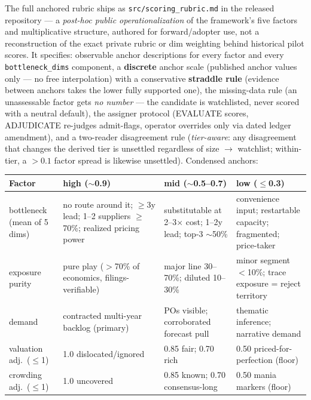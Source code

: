\documentclass[11pt]{article}
\begin{document}
The full anchored rubric ships as \texttt{src/scoring\_rubric.md} in the released repository ---
a \emph{post-hoc public operationalization} of the framework's five factors and multiplicative
structure, authored for forward/adopter use, not a reconstruction of the exact private rubric or
dim weighting behind historical pilot scores. It specifies:
observable anchor descriptions for every factor and every \texttt{bottleneck\_dims} component,
a \textbf{discrete} anchor scale (published anchor values only --- no free interpolation) with a
conservative \textbf{straddle rule} (evidence between anchors takes the lower fully supported
one), the missing-data rule (an unassessable factor gets \emph{no number} --- the candidate
is watchlisted, never scored with a neutral default), the assigner protocol (EVALUATE scores,
ADJUDICATE re-judges admit-flags, operator overrides only via dated ledger amendment), and a
two-reader disagreement rule (\emph{tier-aware}: any disagreement that changes the derived tier
is unsettled regardless of size $\to$ watchlist; within-tier, a $>0.1$ factor spread is likewise
unsettled). Condensed anchors:

\begin{center}
\footnotesize
\begin{tabularx}{\linewidth}{@{}lLLL@{}}
\toprule
\textbf{Factor} & \textbf{high ($\sim$0.9)} & \textbf{mid ($\sim$0.5--0.7)} & \textbf{low ($\leq$0.3)} \\
\midrule
bottleneck (mean of 5 dims) & no route around it; $\geq$3y lead; 1--2 suppliers $\geq$70\%; realized pricing power & substitutable at 2--3$\times$ cost; 1--2y lead; top-3 $\sim$50\% & convenience input; restartable capacity; fragmented; price-taker \\
exposure purity & pure play ($>$70\% of economics, filings-verifiable) & major line 30--70\%; diluted 10--30\% & minor segment $<$10\%; trace exposure = reject territory \\
demand & contracted multi-year backlog (primary) & POs visible; corroborated forecast pull & thematic inference; narrative demand \\
valuation adj.\ ($\leq$1) & 1.0 dislocated/ignored & 0.85 fair; 0.70 rich & 0.50 priced-for-perfection (floor) \\
crowding adj.\ ($\leq$1) & 1.0 uncovered & 0.85 known; 0.70 consensus-long & 0.50 mania markers (floor) \\
\bottomrule
\end{tabularx}
\end{center}
\end{document}
